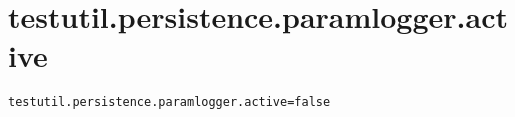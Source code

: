 \section{testutil.persistence.paramlogger.active}
\label{configuration:TestutilPersistenceParamloggerActive}
\ClearAPI
\TODO
{}
\begin{lstlisting}[style=Props,caption={Usage example for \textit{testutil.persistence.paramlogger.active}}]
testutil.persistence.paramlogger.active=false
\end{lstlisting}